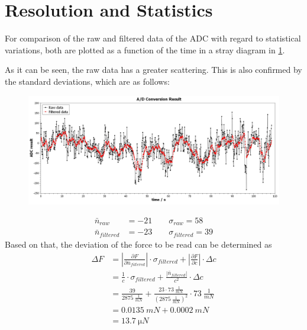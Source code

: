     \section{Resolution and Statistics}
        For comparison of the raw and filtered data of the ADC with regard to statistical variations, both are
        plotted as a function of the time in a stray diagram in \cref{fig:adc_result}.\par
        As it can be seen, the raw data has a greater scattering. This is also confirmed by the standard deviations, which are as follows:
        \begin{figure}[h]
            \centering\includegraphics[width=.9\textwidth]{scidavis/ADC_result.jpg}
            \caption[]{}
            \label{fig:adc_result}
        \end{figure}
        \begin{align*}
            \bar{n}_{raw}       &=-21 \qquad \sigma_{raw}=58\\
            \bar{n}_{filtered}  &=-23 \qquad \sigma_{filtered}=39
        \end{align*}
        Based on that, the deviation of the force to be read can be determined as
        \begin{align}
            \Delta F    &=\left| \frac{\partial F}{\partial \bar{n}_{filtered}} \right| \cdot \sigma_{filtered} + \left| \frac{\partial F}{\partial c} \right| \cdot \Delta c \nonumber \\
                        &=\frac{1}{c} \cdot \sigma_{filtered} + \frac{\left|\bar{n}_{filtered}\right|}{c^2} \cdot \Delta c \nonumber \\
                        &=\frac{39}{\SI{2875}{\frac{1}{mN}}} + \frac{23 \cdot \SI{73}{\frac{1}{mN}}}{(\SI{2875}{\frac{1}{mN}})^2} \cdot \SI{73}{\frac{1}{mN}} \nonumber \\
                        &=\SI{0.0135}{mN}+\SI{0.0002}{mN} \nonumber \\
                        &=\SI{13.7}{\micro N}
        \end{align}
